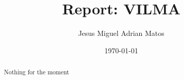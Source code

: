 \documentclass[]{article}
\title{Report: V{\small I}LMA}
\author{Jesus Miguel Adrian Matos}
\date{\today}
\begin{document}
\maketitle

\begin{abstract}
\noindent 
Nothing for the moment




\end{abstract}




\end{document}
